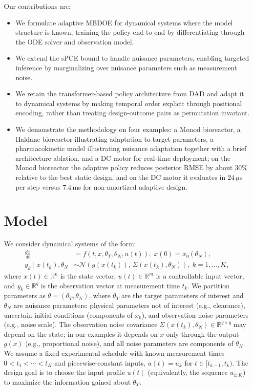 \documentclass[conference]{IEEEtran}
\begin{document}
Our contributions are:
\begin{itemize}
\item We formulate adaptive MBDOE for dynamical systems where the model structure is known, training the policy end-to-end by differentiating through the ODE solver and observation model.
\item We extend the sPCE bound to handle nuisance parameters, enabling targeted inference by marginalizing over nuisance parameters such as measurement noise.
\item We retain the transformer-based policy architecture from DAD and adapt it to dynamical systems by making temporal order explicit through positional encoding, rather than treating design-outcome pairs as permutation invariant.
\item We demonstrate the methodology on four examples: a Monod bioreactor, a Haldane bioreactor illustrating adaptation to target parameters, a pharmacokinetic model illustrating nuisance adaptation together with a brief architecture ablation, and a DC motor for real-time deployment; on the Monod bioreactor the adaptive policy reduces posterior RMSE by about 30\% relative to the best static design, and on the DC motor it evaluates in $24\,\mu$s per step versus $7.4\,$ms for non-amortized adaptive design.
\end{itemize}

\section{Model}
\label{sec:model}
We consider dynamical systems of the form:
\begin{equation}\label{eq:system}
\begin{aligned}
\frac{dx}{dt} &= f(t, x, \theta_T, \theta_N, u(t)), \; x(0) = x_0(\theta_N),\\
y_k \mid x(t_k), \theta_N &\sim \mathcal{N}(g(x(t_k)),\, \Sigma(x(t_k), \theta_N)), \; k = 1, \ldots, K,
\end{aligned}
\end{equation}
where $x(t) \in \mathbb{R}^n$ is the state vector, $u(t) \in \mathbb{R}^m$ is a controllable input vector, and $y_k \in \mathbb{R}^q$ is the observation vector at measurement time $t_k$.
We partition parameters as $\theta = (\theta_T, \theta_N)$, where $\theta_T$ are the target parameters of interest and $\theta_N$ are nuisance parameters: physical parameters not of interest (e.g., clearance), uncertain initial conditions (components of $x_0$), and observation-noise parameters (e.g., noise scale).
The observation noise covariance $\Sigma(x(t_k), \theta_N) \in \mathbb{R}^{q \times q}$ may depend on the state; in our examples it depends on $x$ only through the output $g(x)$ (e.g., proportional noise), and all noise parameters are components of $\theta_N$.
We assume a fixed experimental schedule with known measurement times $0 < t_1 < \cdots < t_K$ and piecewise-constant inputs, $u(t)=u_k$ for $t \in [t_{k-1}, t_k)$.
The design goal is to choose the input profile $u(t)$ (equivalently, the sequence $u_{1:K}$) to maximize the information gained about $\theta_T$.
\end{document}
